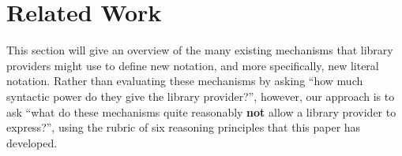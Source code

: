 \documentclass[acmsmall,screen]{acmart}
\newcommand{\li}[1]{\lstinline[basicstyle=\ttfamily\fontsize{9pt}{1em}\selectfont]{#1}}
\begin{document}


\section{Related Work}
\label{sec:existing-approaches}

This section will give an overview of the many existing mechanisms that library providers might use to define new notation, and more specifically, new literal notation. Rather than evaluating these mechanisms by asking ``how much syntactic power do they give the library provider?'', however, our approach is to ask ``what do these mechanisms quite reasonably \textbf{not} allow a library provider to express?'', using the rubric of six reasoning principles that this paper has developed.
\end{document}
